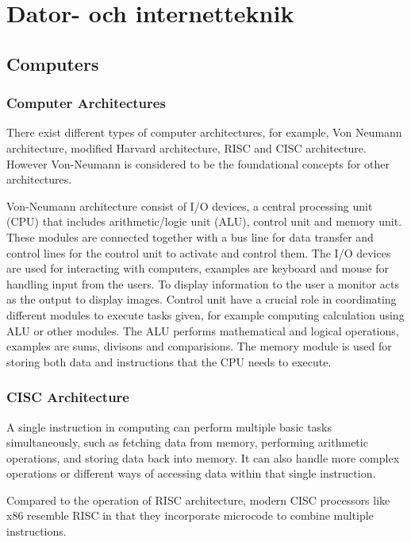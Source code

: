 \documentclass[11pt]{article}
\begin{document}
\section{Dator- och internetteknik}

\subsection{Computers}

\subsubsection{Computer Architectures}

There exist different types of computer architectures, for example, Von Neumann
architecture, modified Harvard architecture\cite{wiki:havard}, RISC and CISC
architecture. However Von-Neumann is considered to be the foundational concepts
for other architectures.

Von-Neumann architecture consist of I/O devices, a central processing unit (CPU)
that includes arithmetic/logic unit (ALU), control unit and memory unit. These
modules are connected together with a bus line for data transfer and control
lines for the control unit to activate and control them. The I/O devices are
used for interacting with computers, examples are keyboard and mouse for
handling input from the users. To display information to the user a monitor
acts as the output to display images. Control unit have a crucial role in
coordinating different modules to execute tasks given, for example computing
calculation using ALU or other modules. The ALU performs mathematical and
logical operations, examples are sums, divisons and comparisions. The memory
module is used for storing both data and instructions that the CPU needs to
execute.\cite{wiki:von}

\subsubsection{CISC Architecture}

A single instruction in computing can perform multiple basic tasks
simultaneously, such as fetching data from memory, performing arithmetic
operations, and storing data back into memory. It can also handle more complex
operations or different ways of accessing data within that single
instruction.\cite{wiki:cisc}

Compared to the operation of RISC architecture, modern CISC processors like x86
resemble RISC in that they incorporate microcode to combine multiple
instructions.
\end{document}
